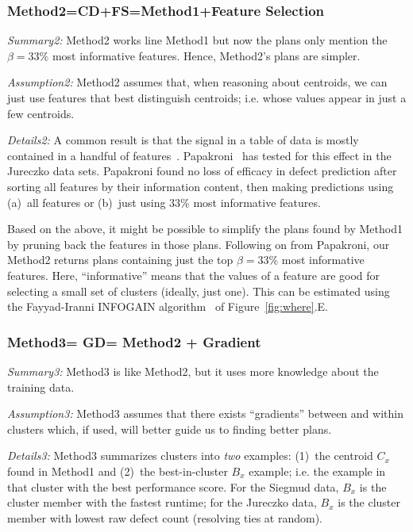 \documentclass{sig-alternate}
\newcommand{\fig}[1]{Figure~\ref{fig:#1}}
\begin{document}
\subsubsection{Method2=CD+FS=Method1+Feature Selection }
 
{\em Summary2:} Method2 works line Method1 but now the   plans  only
mention the $\beta=33\%$ most informative features. Hence, Method2's plans are simpler.

{\em Assumption2: } Method2 assumes that, when reasoning about centroids, we can
just use   features
that   best distinguish    centroids; i.e. whose values appear in just a few centroids.
 

{\em Details2:} A common result is that the signal in a table of data is mostly contained in a handful of features~\cite{hall03,kohavi97}.
Papakroni~\cite{papa13} has tested for this effect in the Jureczko data sets.
Papakroni found no loss of   efficacy in defect prediction after
sorting all features by their information content,
then making predictions using (a)~all  features or (b)~just using   33\% most informative features.

Based on the above, it might be possible to simplify the plans found by Method1  by pruning back the features in those
 plans. Following on from Papakroni, our Method2 returns plans
containing just the top $\beta=33\%$ most informative features. Here, ``informative'' means
that the values of a feature are good for selecting a small set of clusters (ideally,
just one).
This can be estimated using the Fayyad-Iranni INFOGAIN algorithm~\cite{FayIra93Multi}
of \fig{where}.E.
 
 
 
\subsubsection{Method3= GD=   Method2 + Gradient}\label{sect:BIC}

{\em Summary3:} Method3 is like Method2, but it uses more knowledge about the training data.

{\em Assumption3: } Method3 assumes that there exists ``gradients'' between and
within clusters which, if used, will better guide us to finding better plans.

{\em Details3:}
Method3 summarizes clusters into {\em two} examples: (1)~the centroid $C_x$ found in Method1 and
(2)~the best-in-cluster $B_x$  example; i.e. the  example in that cluster
with the best performance score. 
For the Siegmud data, $B_x$ is the cluster member with the fastest runtime;
for the Jureczko data, $B_x$  is the cluster member with lowest raw defect count
(resolving ties at random).
\end{document}
